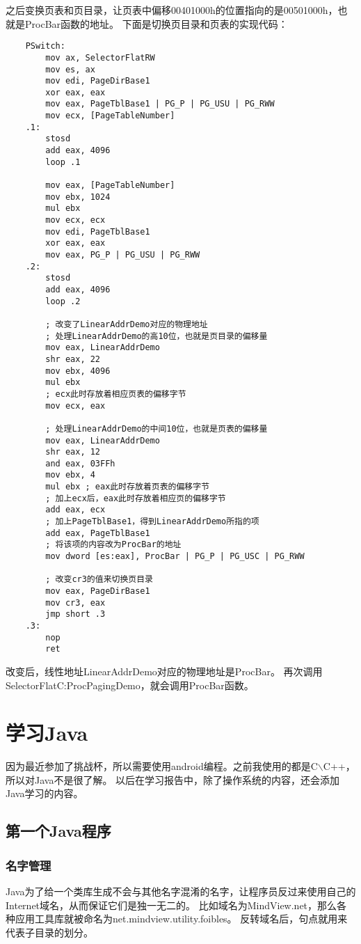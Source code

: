 \documentclass[a4paper,left=2.5cm,right=2.5cm,11pt]{article}
\begin{document}
	之后变换页表和页目录，让页表中偏移00401000h的位置指向的是00501000h，也就是ProcBar函数的地址。
	下面是切换页目录和页表的实现代码：
	\begin{lstlisting}
	PSwitch:
		mov ax, SelectorFlatRW
		mov es, ax
		mov edi, PageDirBase1
		xor eax, eax
		mov eax, PageTblBase1 | PG_P | PG_USU | PG_RWW
		mov ecx, [PageTableNumber]
	.1:
		stosd
		add eax, 4096
		loop .1

		mov eax, [PageTableNumber]
		mov ebx, 1024
		mul ebx
		mov ecx, ecx
		mov edi, PageTblBase1
		xor eax, eax
		mov eax, PG_P | PG_USU | PG_RWW
	.2:
		stosd
		add eax, 4096
		loop .2

		; 改变了LinearAddrDemo对应的物理地址
		; 处理LinearAddrDemo的高10位，也就是页目录的偏移量
		mov eax, LinearAddrDemo
		shr eax, 22
		mov ebx, 4096
		mul ebx 
		; ecx此时存放着相应页表的偏移字节
		mov ecx, eax

		; 处理LinearAddrDemo的中间10位，也就是页表的偏移量
		mov eax, LinearAddrDemo
		shr eax, 12
		and eax, 03FFh
		mov ebx, 4
		mul ebx ; eax此时存放着页表的偏移字节
		; 加上ecx后，eax此时存放着相应页的偏移字节
		add eax, ecx
		; 加上PageTblBase1，得到LinearAddrDemo所指的项
		add eax, PageTblBase1
		; 将该项的内容改为ProcBar的地址
		mov dword [es:eax], ProcBar | PG_P | PG_USC | PG_RWW

		; 改变cr3的值来切换页目录
		mov eax, PageDirBase1
		mov cr3, eax
		jmp short .3
	.3:
		nop
		ret
	\end{lstlisting}

	改变后，线性地址LinearAddrDemo对应的物理地址是ProcBar。
	再次调用SelectorFlatC:ProcPagingDemo，就会调用ProcBar函数。

\clearpage

\section{学习Java}
	因为最近参加了挑战杯，所以需要使用android编程。之前我使用的都是C$\backslash$C++，所以对Java不是很了解。
	以后在学习报告中，除了操作系统的内容，还会添加Java学习的内容。

\subsection{第一个Java程序}
\subsubsection{名字管理}
	Java为了给一个类库生成不会与其他名字混淆的名字，让程序员反过来使用自己的Internet域名，从而保证它们是独一无二的。
	比如域名为MindView.net，那么各种应用工具库就被命名为net.mindview.utility.foibles。
	反转域名后，句点就用来代表子目录的划分。\par
\end{document}
